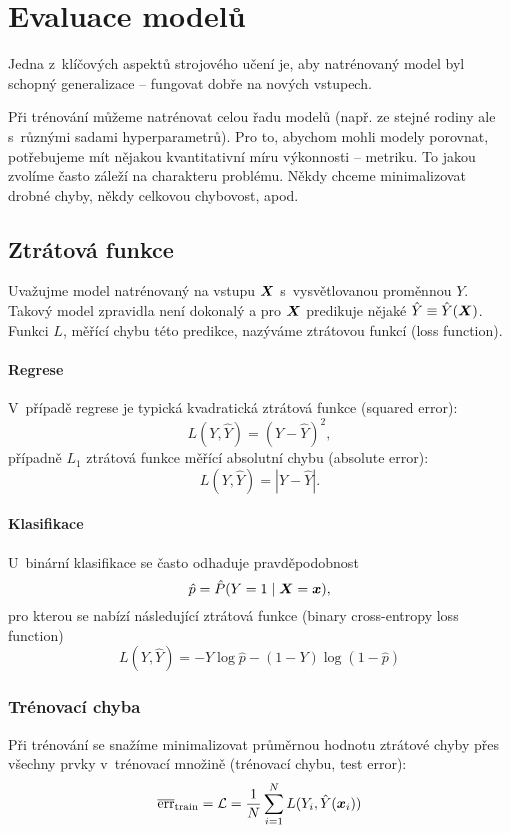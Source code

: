 \section{Evaluace modelů}

Jedna z~klíčových aspektů strojového učení je, aby natrénovaný model byl schopný generalizace -- fungovat dobře na nových vstupech.

Při trénování můžeme natrénovat celou řadu modelů (např. ze stejné rodiny ale s~různými sadami hyperparametrů). Pro to, abychom mohli modely porovnat, potřebujeme mít nějakou kvantitativní míru výkonnosti -- metriku. To jakou zvolíme často záleží na charakteru problému. Někdy chceme minimalizovat drobné chyby, někdy celkovou chybovost, apod.

\subsection{Ztrátová funkce}

Uvažujme model natrénovaný na vstupu $\bm{X}$ s~vysvětlovanou proměnnou $Y$. Takový model zpravidla není dokonalý a pro $\bm{X}$ predikuje nějaké $\hat{Y} \equiv \hat{Y}(\bm{X})$. Funkci $L$, měřící chybu této predikce, nazýváme ztrátovou funkcí (loss function).

\paragraph{Regrese} V~případě regrese je typická kvadratická ztrátová funkce (squared error): \[L(Y, \hat{Y}) = (Y - \hat{Y})^2, \] případně $L_1$  ztrátová funkce měřící absolutní chybu (absolute error): \[L(Y, \hat{Y}) = |Y - \hat{Y}|.\]

\paragraph{Klasifikace} U~binární klasifikace se často odhaduje pravděpodobnost \[\hat{p} = \hat{P}(Y=1 \mid \bm{X} = \bm{x}),\] pro kterou se nabízí následující ztrátová funkce (binary cross-entropy loss function) \[L(Y, \hat{Y}) = -Y\log\hat{p} - (1-Y)\log(1-\hat{p})\]

\subsubsection{Trénovací chyba}

Při trénování se snažíme minimalizovat průměrnou hodnotu ztrátové chyby přes všechny prvky v~trénovací množině (trénovací chybu, test error): \[\overline{\text{err}}_{\text{train}} = \mathcal{L} = \frac{1}{N} \sum_{i=1}^{N} L(Y_i, \hat{Y}(\bm{x}_i))\]


